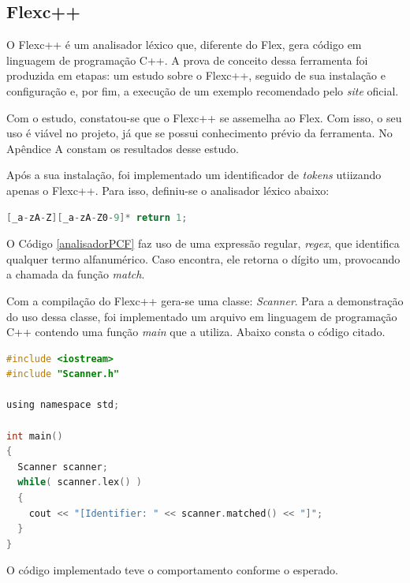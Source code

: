 \subsection{Flexc++} \label{flexcpp}
O Flexc++ é um analisador léxico que, diferente do Flex, gera código em linguagem de programação C++. A prova de conceito dessa ferramenta foi produzida em etapas: um estudo sobre o Flexc++, seguido de sua instalação e configuração e, por fim, a execução de um exemplo recomendado pelo \textit{site} oficial.
\par
\indent Com o estudo, constatou-se que o Flexc++ se assemelha ao Flex. Com isso, o seu uso é viável no projeto, já que se possui conhecimento prévio da ferramenta. No Apêndice A constam os resultados desse estudo.
\par
\indent Após a sua instalação, foi implementado um identificador de \textit{tokens} utiizando apenas o Flexc++. Para isso, definiu-se o analisador léxico abaixo:

\begin{lstlisting}[language=c, label=analisadorPCF, caption={Analisador Léxico da Prova de Conceito do Flexc++}]
%%
[_a-zA-Z][_a-zA-Z0-9]* return 1;
\end{lstlisting}
\par
\indent O Código \ref{analisadorPCF} faz uso de uma expressão regular, \textit{regex}, que identifica qualquer termo alfanumérico. Caso encontra, ele retorna o dígito um, provocando  a chamada da função \textit{match}.
\par
\indent Com a compilação do Flexc++ gera-se uma classe: \textit{Scanner}. Para a demonstração do uso dessa classe, foi implementado um arquivo em linguagem de programação C++ contendo uma função \textit{main} que a utiliza. Abaixo consta o código citado.
\begin{lstlisting}[language=c, label=mainPCF, caption={Função \textit{main} para demonstração do Flexc++}]
#include <iostream>
#include "Scanner.h"

using namespace std;

int main()
{
  Scanner scanner;
  while( scanner.lex() )
  {
    cout << "[Identifier: " << scanner.matched() << "]";
  }
}
\end{lstlisting}
\par
\indent O código implementado teve o comportamento conforme o esperado.

